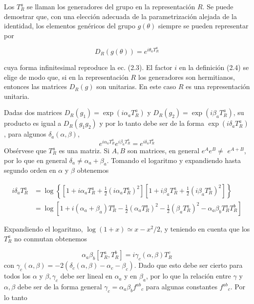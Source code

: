  Los $T_{R}^{a}$ se llaman los generadores del grupo en la representación $R$. Se puede demostrar que, con una elección adecuada de la parametrización alejada de la identidad, los elementos genéricos del grupo $g(\theta)$ siempre se pueden representar por

  \begin{equation*}
    D_{R}(g(\theta))=e^{i \theta_{a} T_{R}^{a}} \tag{2.5}
    \end{equation*}

  cuya forma infinitesimal reproduce la ec. (2.3). El factor $i$ en la definición (2.4) se elige de modo que, si en la representación $R$ los generadores son hermitianos, entonces las matrices $D_{R}(g)$ son unitarias. En este caso $R$ es una representación unitaria.

Dadas dos matrices $D_{R}\left(g_{1}\right)=\exp \left(i \alpha_{a} T_{R}^{a}\right)$ y $D_{R}\left(g_{2}\right)=\exp \left(i \beta_{a} T_{R}^{a}\right)$, su producto es igual a $D_{R}\left(g_{1} g_{2}\right)$ y por lo tanto debe ser de la forma $\exp \left(i \delta_{a} T_{R}^{a}\right)$, para algunos $\delta_{a}(\alpha, \beta)$,
  \begin{equation*}
    e^{i \alpha_{a} T_{R}^{a}} e^{i \beta_{a} T_{R}^{a}}=e^{i \delta_{a} T_{R}^{a}} \tag{2.6}
    \end{equation*}
  Obsérvese que $T_{R}^{a}$ es una matriz. Si $A, B$ son matrices, en general $e^{A} e^{B} \neq$ $e^{A+B}$, por lo que en general $\delta_{a} \neq \alpha_{a}+\beta_{a}$. Tomando el logaritmo y expandiendo hasta segundo orden en $\alpha$ y $\beta$ obtenemos

  \begin{align*}
    i \delta_{a} T_{R}^{a} & =\log \left\{\left[1+i \alpha_{a} T_{R}^{a}+\frac{1}{2}\left(i \alpha_{a} T_{R}^{a}\right)^{2}\right]\left[1+i \beta_{a} T_{R}^{a}+\frac{1}{2}\left(i \beta_{a} T_{R}^{a}\right)^{2}\right]\right\}  \tag{2.7}\\
    & =\log \left[1+i\left(\alpha_{a}+\beta_{a}\right) T_{R}^{a}-\frac{1}{2}\left(\alpha_{a} T_{R}^{a}\right)^{2}-\frac{1}{2}\left(\beta_{a} T_{R}^{a}\right)^{2}-\alpha_{a} \beta_{b} T_{R}^{a} T_{R}^{b}\right]
    \end{align*}

  Expandiendo el logaritmo, $\log (1+x) \simeq x-x^{2} / 2$, y teniendo en cuenta que los $T_{R}^{a}$ no conmutan obtenemos

  \begin{equation*}
    \alpha_{a} \beta_{b}\left[T_{R}^{a}, T_{R}^{b}\right]=i \gamma_{c}(\alpha, \beta) T_{R}^{c} \tag{2.8}
    \end{equation*}
  con $\gamma_{c}(\alpha, \beta)=-2\left(\delta_{c}(\alpha, \beta)-\alpha_{c}-\beta_{c}\right)$. Dado que esto debe ser cierto para todos los $\alpha$ y $\beta, \gamma_{c}$ debe ser lineal en $\alpha_{a}$ y en $\beta_{a}$, por lo que la relación entre $\gamma$ y $\alpha, \beta$ debe ser de la forma general $\gamma_{c}=\alpha_{a} \beta_{b} f^{a b}{ }_{c}$ para algunas constantes $f^{a b}{ }_{c}$. Por lo tanto

